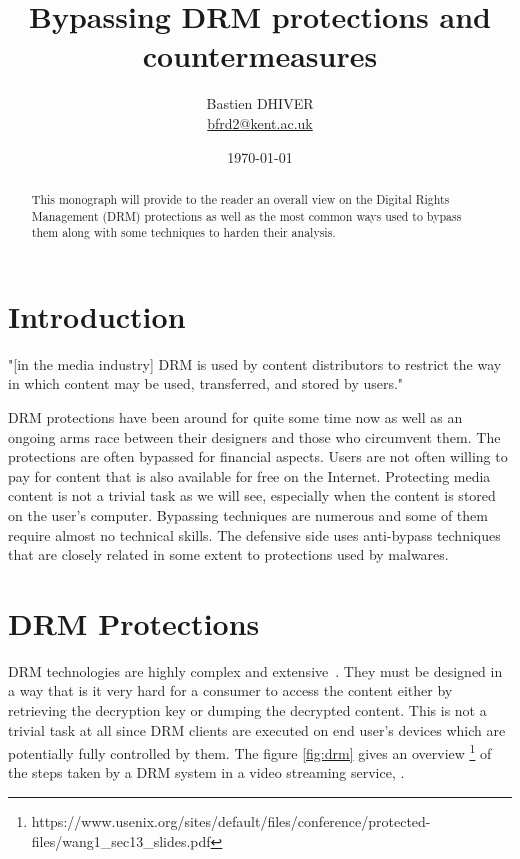 \documentclass[11pt, twocolumn]{article}
\title{Bypassing DRM protections and countermeasures}
\date{\today}
\author{Bastien DHIVER \\ \href{mailto:bfrd2@kent.ac.uk}{bfrd2@kent.ac.uk}}
\begin{document}
\maketitle


\begin{abstract}
	This monograph will provide to the reader an overall view on the Digital Rights Management (DRM) protections as well as the most common ways used to bypass them along with some techniques to harden their analysis.
\end{abstract}

\section{Introduction}

"[in the media industry] DRM is used by content distributors to restrict the way in which content may be used, transferred, and stored by users." \cite{Wang:2013}

DRM protections have been around for quite some time now as well as an ongoing arms race between their designers and those who circumvent them.
The protections are often bypassed for financial aspects.
Users are not often willing to pay for content that is also available for free on the Internet.
Protecting media content is not a trivial task as we will see, especially when the content is stored on the user's computer.
Bypassing techniques are numerous and some of them require almost no technical skills.
The defensive side uses anti-bypass techniques that are closely related in some extent to protections used by malwares.

\section{DRM Protections}

DRM technologies are highly complex and extensive~\cite{Michiels:2005}.
They must be designed in a way that is it very hard for a consumer to access the content either by retrieving the decryption key or dumping the decrypted content.
This is not a trivial task at all since DRM clients are executed on end user's devices which are potentially fully controlled by them.
The figure \ref{fig:drm} gives an overview \footnote{https://www.usenix.org/sites/default/files/conference/protected-files/wang1\_sec13\_slides.pdf} of the steps taken by a DRM system in a video streaming service, .
\end{document}
